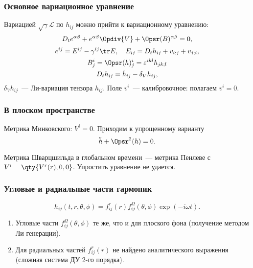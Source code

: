 \documentclass[compress]{beamer}
\begin{document}
    \begin{frame}\frametitle{Основное вариационное уравнение}

        Вариацией $\sqrt{\gamma} \mathcal{L}$ по $h_{ij}$ можно прийти к вариационному уравнению:
        \begin{equation}
            D_t{e^{\alpha\beta}} + e^{\alpha\beta} \Opdiv{V} + \Opsr(B)^{\alpha\beta} = 0,
        \end{equation}
        \begin{gather*}
            e^{ij} = E^{ij} - \gamma^{ij} \tr E, \quad
            E_{ij} = D_t{h_{ij}} + v_{i;j} + v_{j;i}, \\
            B^i_j = \Opsr(h)^i_j = \varepsilon^{ikl} h_{jk;l} \\
            D_t{h_{ij}} = \dot{h}_{ij} - \delta_V h_{ij} ,
        \end{gather*}
        $\delta_V h_{ij}$~--- Ли-вариация тензора $h_{ij}$. Поле $v^i$~--- калибровочное: полагаем $v^i = 0$.

    \end{frame}

    \begin{frame}\frametitle{В плоском пространстве}

        Метрика Минковского: $V^i = 0$. Приходим к упрощенному варианту
        \begin{equation}
            \ddot{h} + \Opsr^2(h) = 0 .
        \end{equation}

        Метрика Шварцшильда в глобальном времени~--- метрика Пенлеве с $V^i = \qty{ V^r(r), 0, 0 }$. Упростить уравнение не удается.

    \end{frame}

    \begin{frame}\frametitle{Угловые и радиальные части гармоник}

        \begin{equation*}
            h_{ij}(t,r,\theta,\phi) = f^r_{ij}(r) f^\Omega_{ij}(\theta,\phi) \exp(-i \omega t) .
        \end{equation*}

        \begin{enumerate}
            \item Угловые части $f^\Omega_{ij}(\theta,\phi)$ те же, что и для плоского фона (получение методом Ли-генерации).
            \item Для радиальных частей $f^r_{ij}(r)$ не найдено аналитического выражения (сложная система ДУ 2-го порядка).
        \end{enumerate}

    \end{frame}
\end{document}
